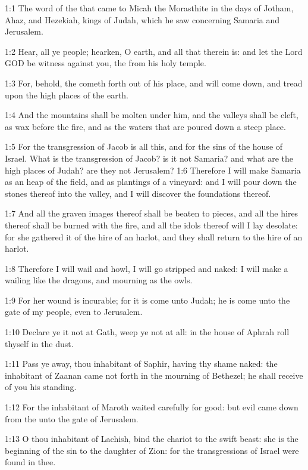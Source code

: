 

1:1 The word of the \LORD that came to Micah the Morasthite in the days of Jotham, Ahaz, and Hezekiah, kings of Judah, which he saw concerning Samaria and Jerusalem.

1:2 Hear, all ye people; hearken, O earth, and all that therein is: and let the Lord GOD be witness against you, the \LORD from his holy temple.

1:3 For, behold, the \LORD cometh forth out of his place, and will come down, and tread upon the high places of the earth.

1:4 And the mountains shall be molten under him, and the valleys shall be cleft, as wax before the fire, and as the waters that are poured down a steep place.

1:5 For the transgression of Jacob is all this, and for the sins of the house of Israel. What is the transgression of Jacob? is it not Samaria? and what are the high places of Judah? are they not Jerusalem?  1:6 Therefore I will make Samaria as an heap of the field, and as plantings of a vineyard: and I will pour down the stones thereof into the valley, and I will discover the foundations thereof.

1:7 And all the graven images thereof shall be beaten to pieces, and all the hires thereof shall be burned with the fire, and all the idols thereof will I lay desolate: for she gathered it of the hire of an harlot, and they shall return to the hire of an harlot.

1:8 Therefore I will wail and howl, I will go stripped and naked: I will make a wailing like the dragons, and mourning as the owls.

1:9 For her wound is incurable; for it is come unto Judah; he is come unto the gate of my people, even to Jerusalem.

1:10 Declare ye it not at Gath, weep ye not at all: in the house of Aphrah roll thyself in the dust.

1:11 Pass ye away, thou inhabitant of Saphir, having thy shame naked: the inhabitant of Zaanan came not forth in the mourning of Bethezel; he shall receive of you his standing.

1:12 For the inhabitant of Maroth waited carefully for good: but evil came down from the \LORD unto the gate of Jerusalem.

1:13 O thou inhabitant of Lachish, bind the chariot to the swift beast: she is the beginning of the sin to the daughter of Zion: for the transgressions of Israel were found in thee.

